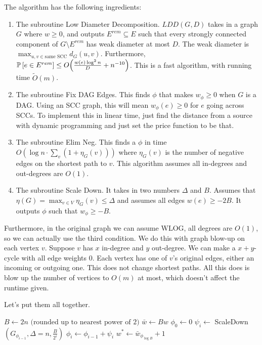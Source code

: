 The algorithm has the following ingredients:
\begin{enumerate}
    \item The subroutine Low Diameter Decomposition. $LDD(G, D)$ takes in a graph $G$ where $w \geq 0$, and outputs $E^{rem} \subseteq E$ such that every strongly connected component of $G \setminus E^{rem}$
    has weak diameter at most $D$. The weak diameter is $\max_{u, v \in \text{same SCC}} d_G(u, v)$. Furthermore, $\mathbb{P}\left[ e \in E^{rem} \right] \leq O\qty(\frac{w(e) \log^2 n}{D} + n^{-10})$. This is a fast algorithm, with running time $\tilde{O}(m)$.
    \item The subroutine Fix DAG Edges. This finds $\phi$ that makes $w_{\phi} \geq 0$ when $G$ is a DAG. Using an SCC graph, this will mean $w_{\phi}(e) \geq 0$ for $e$ going across SCCs.
    To implement this in linear time, just find the distance from a source with dynamic programming and just set the price function to be that.
    \item The subroutine Elim Neg. This finds a $\phi$ in time $O(\log n \cdot \sum_v (1 + \eta_G(v)))$ where $\eta_G(v)$ is the number of negative edges
    on the shortest path to $v$. This algorithm assumes all in-degrees and out-degrees are $O(1)$.
    \item The subroutine Scale Down. It takes in two numbers $\Delta$ and $B$. Assumes that $\eta(G) = \max_{v \in V} \eta_G(v) \leq \Delta$ and assumes all edges $w(e) \geq -2B$. It outputs $\phi$ such that $w_{\phi} \geq -B$.
\end{enumerate}

Furthermore, in the original graph we can assume WLOG, all degrees are $O(1)$, so we can actually use the third condition. We do this with graph blow-up on each vertex
$v$. Suppose $v$ has $x$ in-degree and $y$ out-degree. We can make a $x + y$-cycle with all edge weights $0$. Each vertex has one of $v$'s original edges, either an incoming or outgoing one.
This does not change shortest paths. All this does is blow up the number of vertices to $O(m)$ at most, which doesn't affect the runtime given.

Let's put them all together.
\begin{algothm}
    \begin{algorithmic}
        \State $B \gets 2n \text{ (rounded up to nearest power of 2)}$
        \State $\bar{w} \gets B w$
        \State $\phi_0 \gets 0$
            \State $\psi_i \gets$ ScaleDown$(G_{\phi_{i - 1}}, \Delta = n, \frac{B}{2^i})$
            \State $\phi_i \gets \phi_{i - 1} + \psi_i$
        \EndFor
        \State $w^* \gets \bar{w}_{\phi_{\log B}} + 1$
    \EndFunction
    \end{algorithmic}
\end{algothm}